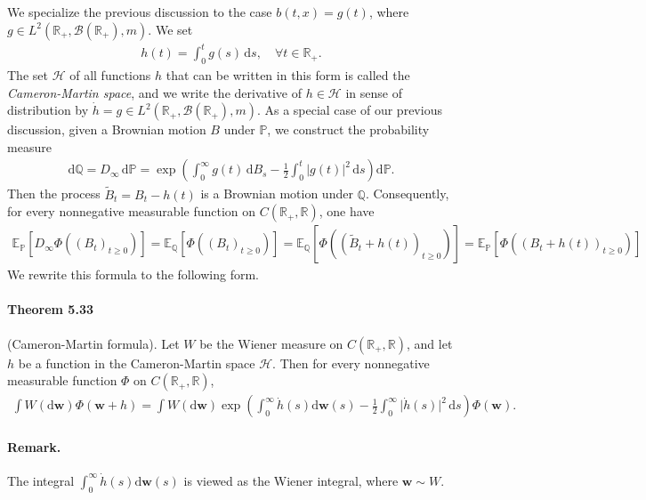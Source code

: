 \documentclass{article}
\numberwithin{equation}{section}
\newcommand{\E}{\mathbb{E}}
\newcommand{\bfw}{\mathbf{w}}
\newcommand{\bbP}{\mathbb{P}}
\newcommand{\bbQ}{\mathbb{Q}}
\newcommand{\bbR}{\mathbb{R}}
\newcommand{\scr}{\mathscr}
\renewcommand{\d}{\mathrm{d}}
\theoremstyle{plain}
\theoremstyle{definition}
\begin{document}
We specialize the previous discussion to the case $b(t,x)=g(t)$, where $g\in L^2(\mathbb{R}_+,\mathscr{B}(\mathbb{R}_+),m)$. We set
\begin{align*}
	h(t) = \int_0^tg(s)\,\d s,\quad\forall t\in\mathbb{R}_+.
\end{align*}
The set $\mathscr{H}$ of all functions $h$ that can be written in this form is called the \textit{Cameron-Martin space}, and we write the derivative of $h\in\mathscr{H}$ in sense of distribution by $\dot{h}=g\in L^2(\mathbb{R}_+,\mathscr{B}(\mathbb{R}_+),m)$. As a special case of our previous discussion, given a Brownian motion $B$ under $\bbP$, we construct the probability measure
\begin{align*}
	\d\bbQ = D_\infty\,\d\bbP = \exp\left(\int_0^\infty g(t)\,\d B_s-\frac{1}{2}\int_0^t\vert g(t)\vert^2\,\d s\right)\d\bbP.
\end{align*}
Then the process $\widetilde{B}_t=B_t-h(t)$ is a Brownian motion under $\bbQ$. Consequently, for every nonnegative measurable function on $C(\bbR_+,\bbR)$, one have
\begin{align*}
	\E_\bbP\left[D_\infty\Phi((B_t)_{t\geq 0})\right]=\E_\bbQ\left[\Phi((B_t)_{t\geq 0})\right]=\E_\bbQ\left[\Phi\left((\widetilde{B}_t+h(t))_{t\geq 0}\right)\right]=\E_\bbP\left[\Phi((B_t+h(t))_{t\geq 0})\right]
\end{align*}
We rewrite this formula to the following form.

\paragraph{Theorem 5.33\label{thm:5.33}} (Cameron-Martin formula). Let $W$ be the Wiener measure on $C(\bbR_+,\bbR)$, and let $h$ be a function in the Cameron-Martin space $\scr{H}$. Then for every nonnegative measurable function $\Phi$ on $C(\bbR_+,\bbR)$,
\begin{align*}
	\int W(\d\bfw)\Phi(\bfw+h) = \int W(\d\bfw)\exp\left(\int_0^\infty\dot{h}(s)\d\bfw(s)-\frac{1}{2}\int_0^\infty\vert\dot{h}(s)\vert^2\,\d s\right)\Phi(\bfw).
\end{align*}
\paragraph{Remark.} The integral $\int_0^\infty\dot{h}(s)\d\bfw(s)$ is viewed as the Wiener integral, where $\bfw\sim W$.
\end{document}
